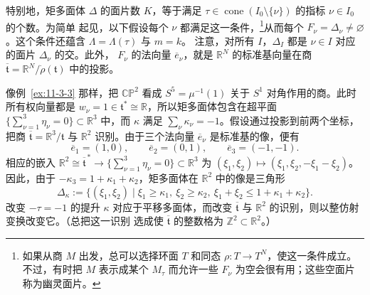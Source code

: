 特别地，矩多面体 $\Delta$ 的面片数 $K$，等于满足
$\tau\in\operatorname{cone}(I_0\setminus\{\nu\})$ 的指标 $\nu\in I_0$ 的个数。为简单
起见，以下假设每个 $\nu$ 都满足这一条件，\footnote{如果从商 $M$ 出发，总可以选择环面
$T$ 和同态 $\rho:T\to T^N$，使这一条件成立。不过，有时把 $M$ 表示成某个 $M_\tau$
而允许一些 $F_\nu$ 为空会很有用；这些空面片称为幽灵面片。}从而每个
$F_\nu=\Delta_\nu\ne\varnothing$。这个条件还蕴含 $\Lambda=\Lambda(\tau)$ 与 $m=k$。
注意，对所有 $I$，$\Delta_I$ 都是 $\nu\in I$ 对应的面片 $\Delta_\nu$ 的交。此外，
$F_\nu$ 的法向量 $\overline e_\nu$，就是 $\mathbb R^N$ 的标准基向量在商
$\overline{\mathfrak t}=\mathbb R^N/\dot\rho(\mathfrak t)$ 中的投影。

\begin{example}\label{ex:11-3-6}
像例~\ref{ex:11-3-3} 那样，把 $\mathbb{CP}^2$ 看成
$S^5=\mu^{-1}(1)$ 关于 $S^1$ 对角作用的商。此时所有权向量都是
$w_\nu=1\in\mathfrak t^*\cong\mathbb R$，所以矩多面体包含在超平面
$\{\sum_{\nu=1}^3\eta_\nu=0\}\subset\mathbb R^3$ 中，而 $\kappa$ 满足
$\sum_\nu\kappa_\nu=-1$。假设通过投影到前两个坐标，把商
$\overline{\mathfrak t}=\mathbb R^3/\mathfrak t$ 与 $\mathbb R^2$ 识别。由于三个法向量
$\overline e_\nu$ 是标准基的像，便有
\[
  \overline e_1=(1,0),\qquad
  \overline e_2=(0,1),\qquad
  \overline e_3=(-1,-1).
\]
相应的嵌入
$\mathbb R^2\cong\overline{\mathfrak t}^{\,*}\to
\{\sum_{\nu=1}^3\eta_\nu=0\}\subset\mathbb R^3$ 为
$(\xi_1,\xi_2)\mapsto(\xi_1,\xi_2,-\xi_1-\xi_2)$。因此，由于
$-\kappa_3=1+\kappa_1+\kappa_2$，矩多面体在 $\mathbb R^2$ 中的像是三角形
\[
  \Delta_\kappa:=\{(\xi_1,\xi_2)\mid
  \xi_1\geq\kappa_1,\ \xi_2\geq\kappa_2,\
  \xi_1+\xi_2\leq1+\kappa_1+\kappa_2\}.
\]
改变 $-\tau=-1$ 的提升 $\kappa$ 对应于平移多面体，而改变
$\overline{\mathfrak t}$ 与 $\mathbb R^2$ 的识别，则以整仿射变换改变它。（总把这一识别
选成使 $\overline{\mathfrak t}$ 的整数格为 $\mathbb Z^2\subset\mathbb R^2$。）
\end{example}

